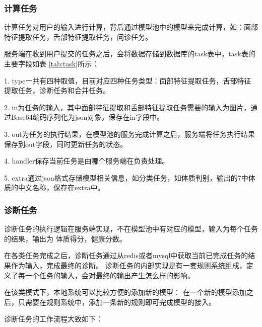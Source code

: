 \subsubsection{计算任务}
计算任务对用户的输入进行计算，背后通过模型池中的模型来完成计算，如：面部特征提取任务，舌部特征提取任务，问诊任务。

服务端在收到用户提交的任务之后，会将数据存储到数据库的task表中，task表的主要字段如表 \ref{tab:task}所示：

1. type一共有四种取值，目前对应四种任务类型：面部特征提取任务，舌部特征提取任务，诊断任务和合并任务。

2. in为任务的输入，其中面部特征提取和舌部特征提取任务需要的输入为图片，通过Base64编码序列化为json对象，保存在in字段中。

3. out为任务的执行结果，在模型池的服务完成计算之后，服务端将任务执行结果保存到out字段，同时更新任务的状态。

4. handler保存当前任务是由哪个服务端在负责处理。

5. extra通过json格式存储模型相关信息，如分类任务，如体质判别，输出的7中体质的中文名称，保存在extra中。


\subsubsection{诊断任务}


诊断任务的执行逻辑在服务端实现，不在模型池中有对应的模型，输入为每个任务的结果，输出为 体质得分，健康分数。

在各类任务完成之后，诊断任务通过从redis或者mysql中获取当前已完成任务的结果作为输入，完成最终的诊断。 
诊断任务的内部实现是有一套规则系统组成，定义了每一个任务的输入，会对最终的输出产生怎么样的影响。

在该类模式下，本地系统可以比较方便的添加新的模型： 在一个新的模型添加之后，只需要在规则系统中，添加一条新的规则即可完成模型的接入。

诊断任务的工作流程大致如下：

